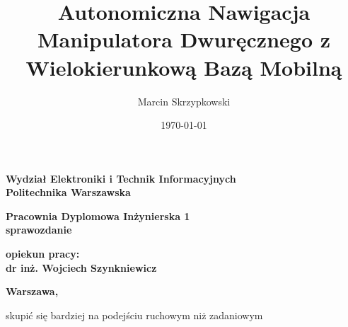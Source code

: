 \documentclass{article}
\title{Autonomiczna Nawigacja Manipulatora Dwuręcznego z Wielokierunkową Bazą Mobilną}
\date{\today}
\author{Marcin Skrzypkowski}
\begin{document}
	
	
	\makeatletter
	\renewcommand{\maketitle}{\begin{titlepage}
		\begin{center}{\LARGE {\bf Wydział Elektroniki i Technik Informacyjnych}}\\
			\vspace{0.4cm}
			{\LARGE {\bf Politechnika Warszawska}}\\
			\vspace{0.3cm}
		\end{center}
		\vspace{5cm}
		\begin{center}
			{\bf \LARGE Pracownia Dyplomowa Inżynierska  1\\ sprawozdanie  \vskip 0.1cm}
		\end{center}
		\vspace{1cm}
		\begin{center}
			{\bf \LARGE \@title}
		\end{center}
		\vspace{2cm}
		\begin{center}
			{\bf \Large \@author \par}
		\end{center}
		\vspace*{\stretch{1}}
		\begin{center}
			{\bf \large opiekun pracy: \\ dr inż. Wojciech Szynkniewicz\par}
		\end{center}
		\vspace*{\stretch{5}}
		\begin{center}
			\bf{\large{Warszawa, \@date\vskip 0.1cm}}
		\end{center}
		\end{titlepage}
}
\makeatother	


	

	\maketitle
	\newpage



	\tableofcontents

	\newpage
	\doublespacing
skupić się bardziej na podejściu ruchowym niż zadaniowym 	
	
\end{document}
